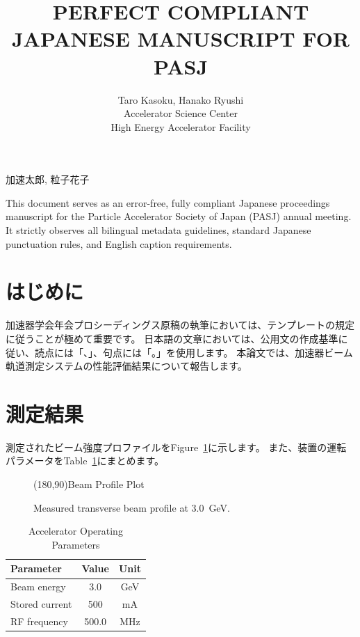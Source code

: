 \documentclass{PASJ2026}
\begin{document}
\title{PERFECT COMPLIANT JAPANESE MANUSCRIPT FOR PASJ}

\jauthor
{
加速太郎,
粒子花子
}

\author
{
Taro Kasoku,
Hanako Ryushi\\
 Accelerator Science Center\\
 High Energy Accelerator Facility\\
}

\Abstract
{
This document serves as an error-free, fully compliant Japanese proceedings manuscript for the Particle Accelerator Society of Japan (PASJ) annual meeting. It strictly observes all bilingual metadata guidelines, standard Japanese punctuation rules, and English caption requirements.
}

\maketitle

\section{はじめに}
加速器学会年会プロシーディングス原稿の執筆においては、テンプレートの規定に従うことが極めて重要です。
日本語の文章においては、公用文の作成基準に従い、読点には「、」、句点には「。」を使用します。
本論文では、加速器ビーム軌道測定システムの性能評価結果について報告します。

\section{測定結果}
測定されたビーム強度プロファイルをFigure~\ref{fig:profile}に示します。
また、装置の運転パラメータをTable~\ref{tab:params}にまとめます。

\begin{figure}[htb]
\centering
\framebox(180,90){Beam Profile Plot}
\caption{Measured transverse beam profile at 3.0~GeV.}
\label{fig:profile}
\end{figure}

\begin{table}[htb]
\caption{Accelerator Operating Parameters}
\label{tab:params}
\centering
\begin{tabular}{lcc}
\hline
Parameter & Value & Unit \\
\hline
Beam energy & 3.0 & GeV \\
Stored current & 500 & mA \\
RF frequency & 500.0 & MHz \\
\hline
\end{tabular}
\end{table}
\end{document}
